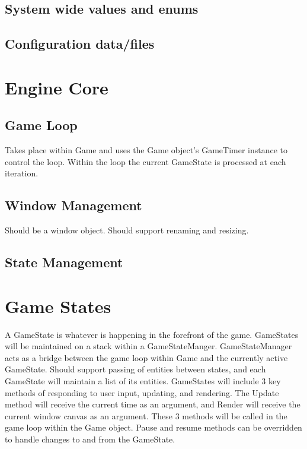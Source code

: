 \documentclass[12pt]{article}
\begin{document}
\subsection{	System wide values and enums}

\subsection{	Configuration data/files}

\section{Engine Core}
\subsection{Game Loop}
Takes place within Game and uses the Game object's GameTimer instance to control the loop.  Within the loop the current GameState is processed at each iteration.

\subsection{Window Management}
Should be a window object.  Should support renaming and resizing.

\subsection{State Management}
	
\section{	Game States}
A GameState is whatever is happening in the forefront of the game.  GameStates will be maintained on a stack within a GameStateManger.  GameStateManager acts as a bridge between the game loop within Game and the currently active GameState.  Should support passing of entities between states, and each GameState will maintain a list of its entities.  GameStates will include 3 key methods of responding to user input, updating, and rendering.  The Update method will receive the current time as an argument, and Render will receive the current window canvas as an argument.  These 3 methods will be called in the game loop within the Game object.  Pause and resume methods can be overridden to handle changes to and from the GameState.
\end{document}
